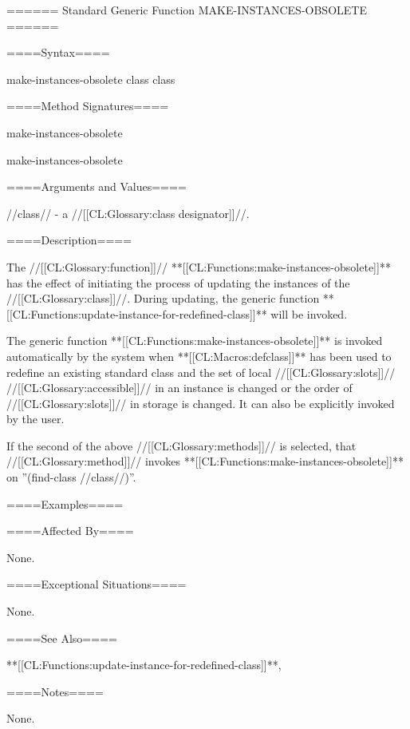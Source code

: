 ====== Standard Generic Function MAKE-INSTANCES-OBSOLETE ======

====Syntax====

\DefgenWithValues make-instances-obsolete {class} {class}

====Method Signatures====

\Defmeth make-instances-obsolete {}

\Defmeth make-instances-obsolete {}

====Arguments and Values====

//class// - a //[[CL:Glossary:class designator]]//.

====Description====

The //[[CL:Glossary:function]]// **[[CL:Functions:make-instances-obsolete]]** has the effect of initiating the process of updating the instances of the //[[CL:Glossary:class]]//. During updating, the generic function **[[CL:Functions:update-instance-for-redefined-class]]** will be invoked.

The generic function **[[CL:Functions:make-instances-obsolete]]** is invoked automatically by the system when **[[CL:Macros:defclass]]** has been used to redefine an existing standard class and the set of local //[[CL:Glossary:slots]]// //[[CL:Glossary:accessible]]// in an instance is changed or the order of //[[CL:Glossary:slots]]// in storage is changed. It can also be explicitly invoked by the user.

If the second of the above //[[CL:Glossary:methods]]// is selected, that //[[CL:Glossary:method]]// invokes **[[CL:Functions:make-instances-obsolete]]** on ''(find-class //class//)''.

====Examples====


====Affected By====

None.

====Exceptional Situations====

None.

====See Also====

**[[CL:Functions:update-instance-for-redefined-class]]**, {\secref\ClassReDef}

====Notes====

None.


